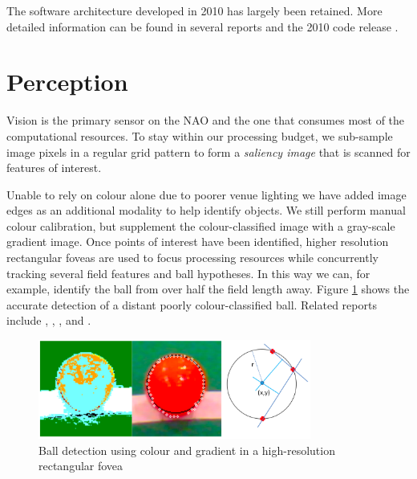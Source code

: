 \documentclass[runningheads,a4paper]{llncs}
\begin{document}
The software architecture developed in 2010 has largely been retained. More detailed information can be found in several reports \cite{cse10rUNSWift2010}  \cite{claridge2011generationpython} and the 2010 code release \cite{claridge2010runswiftcoderelease}.





\section{Perception}

Vision is the primary sensor on the NAO and the one that consumes most of the computational resources. To stay within our processing budget, we sub-sample image pixels in a regular grid pattern to form a \emph{saliency image} that is scanned for features of interest. 

Unable to rely on colour alone due to poorer venue lighting we have added image edges as an additional modality to help identify objects. We still perform manual colour calibration, but supplement the colour-classified image with a gray-scale gradient image. Once points of interest have been identified, higher resolution rectangular foveas are used to focus processing resources while concurrently tracking several field features and ball hypotheses. In this way we can, for example, identify the ball from over half the field length away.  Figure \ref{figBallDetection} shows the accurate detection of a distant poorly colour-classified ball. Related reports include \cite{cse10rUNSWift2010}, \cite{hengst10robocup}, \cite{chatfield2011foveated}, and \cite{ratter2011fast}.

\begin{figure} [h]
\centering
\includegraphics[width=0.8\textwidth]{Figures/figBallDetection}
\caption{Ball detection using colour and gradient in a high-resolution rectangular fovea 
} \label{figBallDetection}
\end{figure}
\end{document}
